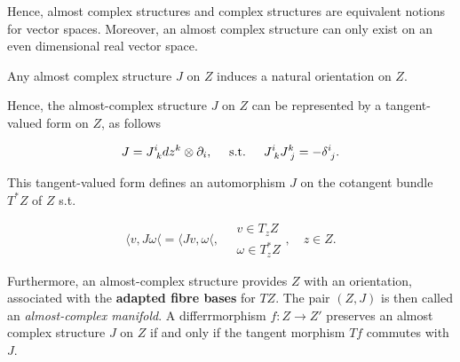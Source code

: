 Hence, almost complex structures and complex structures are equivalent notions for vector spaces. Moreover, an almost complex structure can only exist on an even dimensional real vector space. 

\begin{lemma}
    Any almost complex structure $J$ on $Z$ induces a natural orientation on $Z$. 
\end{lemma}
      
Hence, the almost-complex structure $J$ on $Z$ can be represented by a tangent-valued form on $Z$, as follows 

\begin{equation}
    J = J^{i}_{\textnormal{ } k} dz^k \otimes \partial_i, \quad \textnormal{ s.t. } \quad J^{i}_{\textnormal{ } k} J^{k}_{\textnormal{ } j} = - \delta^{i}_{\textnormal{ } j}. 
\end{equation}

This tangent-valued form defines an automorphism $J$ on the cotangent bundle $T^{*}Z$ of $Z$ s.t. 

\begin{equation*}
    \langle v, J \omega \langle = \langle J v, \omega \langle, \quad \begin{array}{cc}
         v \in T_z Z  \\
         \omega \in T_z^{*}Z 
    \end{array}, \quad z \in Z.
\end{equation*}

Furthermore, an almost-complex structure provides $Z$ with an orientation, associated with the \textbf{adapted fibre bases} for $TZ$. 
The pair $(Z,J)$ is then called an \textit{almost-complex manifold}. A differrmorphism $f: Z \rightarrow Z'$ preserves an almost complex structure $J$ on $Z$ if and only if the tangent morphism $Tf$ commutes with $J$. \medbreak






